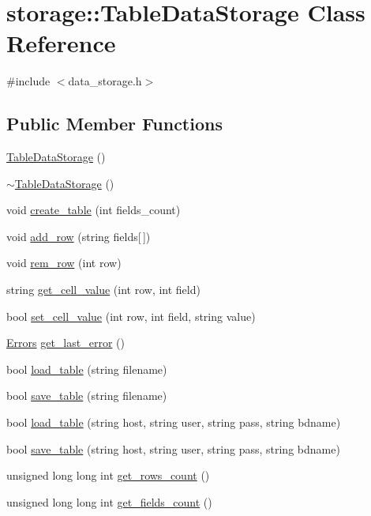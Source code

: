 \hypertarget{classstorage_1_1TableDataStorage}{
\section{storage::TableDataStorage Class Reference}
\label{df/d87/classstorage_1_1TableDataStorage}
}


{\ttfamily \#include $<$data\_\-storage.h$>$}

\subsection*{Public Member Functions}
\begin{DoxyCompactItemize}
\item 
\hyperlink{classstorage_1_1TableDataStorage_a91d68894f40a7ed48041d6da83bcbb6f}{TableDataStorage} ()
\item 
\hyperlink{classstorage_1_1TableDataStorage_a6e988f0e5213f79711eaa15dce114df4}{$\sim$TableDataStorage} ()
\item 
void \hyperlink{classstorage_1_1TableDataStorage_a659685562ccafaa19e8f1e58ce6576c1}{create\_\-table} (int fields\_\-count)
\item 
void \hyperlink{classstorage_1_1TableDataStorage_a6f62b42d9309e7792f029d53b51816ba}{add\_\-row} (string fields\mbox{[}$\,$\mbox{]})
\item 
void \hyperlink{classstorage_1_1TableDataStorage_ab2aee9b1629a1bd21daf490d85e39c29}{rem\_\-row} (int row)
\item 
string \hyperlink{classstorage_1_1TableDataStorage_a4366051dffb6a58c1c2d9c9b6bb5c4b0}{get\_\-cell\_\-value} (int row, int field)
\item 
bool \hyperlink{classstorage_1_1TableDataStorage_a8562901c5f3864d68e8df2e68f334640}{set\_\-cell\_\-value} (int row, int field, string value)
\item 
\hyperlink{namespacestorage_aedd3c880e9744762de535deb2adcf6be}{Errors} \hyperlink{classstorage_1_1TableDataStorage_a6b4bfe6422d92d6561b14e4c5b4bc423}{get\_\-last\_\-error} ()
\item 
bool \hyperlink{classstorage_1_1TableDataStorage_a6f3a1ad98a2018e095f6bbcffdfeb9a8}{load\_\-table} (string filename)
\item 
bool \hyperlink{classstorage_1_1TableDataStorage_a408e93fa9efee49c3809e4afcc0d58e0}{save\_\-table} (string filename)
\item 
bool \hyperlink{classstorage_1_1TableDataStorage_a0d5d76c0db83f278d6e3e2dd08094d36}{load\_\-table} (string host, string user, string pass, string bdname)
\item 
bool \hyperlink{classstorage_1_1TableDataStorage_ac4ea64d9efd96af23f621500606adbe3}{save\_\-table} (string host, string user, string pass, string bdname)
\item 
unsigned long long int \hyperlink{classstorage_1_1TableDataStorage_a49af804e3b872ae12f67d4d0b78ca7ab}{get\_\-rows\_\-count} ()
\item 
unsigned long long int \hyperlink{classstorage_1_1TableDataStorage_a2a1cad158e2c20292f9474403ca4c6ef}{get\_\-fields\_\-count} ()
\end{DoxyCompactItemize}


